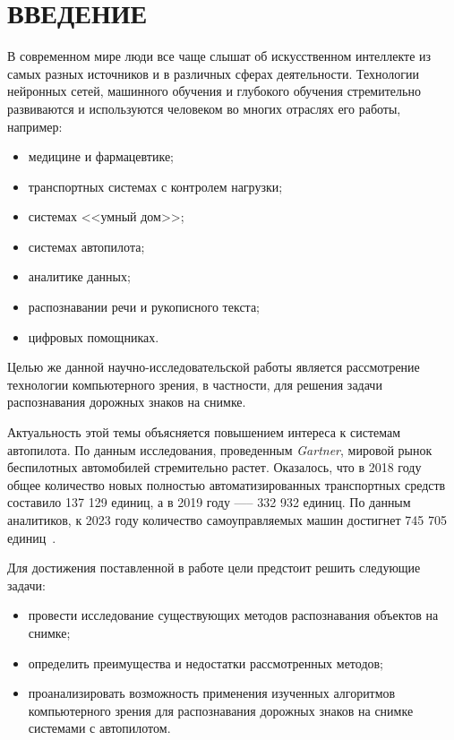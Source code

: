 \chapter*{ВВЕДЕНИЕ}

В современном мире люди все чаще слышат об искусственном интеллекте из самых разных источников и в различных сферах деятельности. Технологии нейронных сетей, машинного обучения и глубокого обучения стремительно развиваются и используются человеком во многих отраслях его работы, например:
\begin{itemize}[label=---]
    \item медицине и фармацевтике;
    \item транспортных системах с контролем нагрузки;
    \item системах <<умный дом>>;
    \item системах автопилота;
    \item аналитике данных;
    \item распознавании речи и рукописного текста;
    \item цифровых помощниках.
\end{itemize}

Целью же данной научно-исследовательской работы является рассмотрение технологии компьютерного зрения, в частности, для решения задачи распознавания дорожных знаков на снимке.

Актуальность этой темы объясняется повышением интереса к системам автопилота. По данным исследования, проведенным \textit{Gartner}, мировой рынок беспилотных автомобилей стремительно растет. Оказалось, что в 2018 году общее количество новых полностью автоматизированных транспортных средств составило 137 129 единиц, а в 2019 году —-- 332 932 единиц. По данным аналитиков, к 2023 году количество самоуправляемых машин достигнет 745 705 единиц~\cite{tadviser}.

Для достижения поставленной в работе цели предстоит решить следующие задачи:
\begin{itemize}[label=---]
    \item провести исследование существующих методов распознавания объектов на снимке;
    \item определить преимущества и недостатки рассмотренных методов;
    \item проанализировать возможность применения изученных алгоритмов компьютерного зрения для распознавания дорожных знаков на снимке системами с автопилотом.
\end{itemize}


